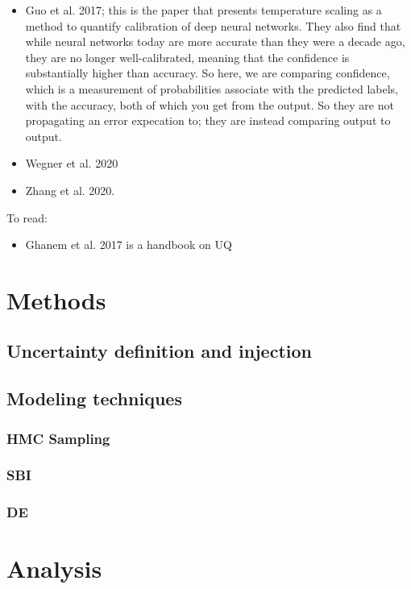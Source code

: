 \documentclass[twocolumn]{aastex631}
\begin{document}
\begin{itemize}
    \item Guo et al. 2017; this is the paper that presents temperature scaling as a method to quantify calibration of deep neural networks.
    They also find that while neural networks today are more accurate than they were a decade ago, they are no longer well-calibrated, meaning that the confidence is substantially higher than accuracy.
    So here, we are comparing confidence, which is a measurement of probabilities associate with the predicted labels, with the accuracy, both of which you get from the output.
    So they are not propagating an error expecation to; they are instead comparing output to output. 
    \item Wegner et al. 2020
    \item Zhang et al. 2020.
\end{itemize}

To read:
\begin{itemize}
    \item Ghanem et al. 2017 is a handbook on UQ
\end{itemize}

\section{Methods}
\subsection{Uncertainty definition and injection}
\subsection{Modeling techniques}
\subsubsection{HMC Sampling}
\subsubsection{SBI}
\subsubsection{DE}

\section{Analysis}
\subsection{}
\end{document}

